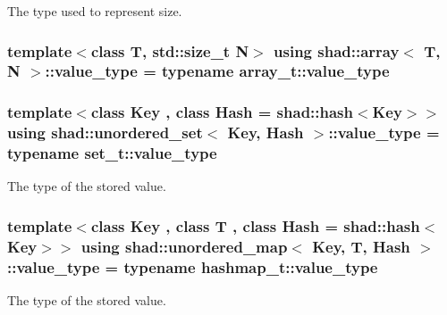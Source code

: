 The type used to represent size. 

\hypertarget{group__Types_gaf417752888d4f1e19286503579310a52}{
\subsubsection[{value\-\_\-type}]{\setlength{\rightskip}{0pt plus 5cm}template$<$class T, std\-::size\-\_\-t N$>$ using {\bf shad\-::array}$<$ T, N $>$\-::value\-\_\-type =  typename array\-\_\-t\-::value\-\_\-type}}\label{group__Types_gaf417752888d4f1e19286503579310a52}
\hypertarget{group__Types_ga56832ea0d8218bf22f59a2e8ff4de499}{
\subsubsection[{value\-\_\-type}]{\setlength{\rightskip}{0pt plus 5cm}template$<$class Key , class Hash  = shad\-::hash$<$\-Key$>$$>$ using {\bf shad\-::unordered\-\_\-set}$<$ Key, Hash $>$\-::value\-\_\-type =  typename set\-\_\-t\-::value\-\_\-type}}\label{group__Types_ga56832ea0d8218bf22f59a2e8ff4de499}


The type of the stored value. 

\hypertarget{group__Types_ga930e4848d41a2efe4d2e47f52650a76c}{
\subsubsection[{value\-\_\-type}]{\setlength{\rightskip}{0pt plus 5cm}template$<$class Key , class T , class Hash  = shad\-::hash$<$\-Key$>$$>$ using {\bf shad\-::unordered\-\_\-map}$<$ Key, T, Hash $>$\-::value\-\_\-type =  typename hashmap\-\_\-t\-::value\-\_\-type}}\label{group__Types_ga930e4848d41a2efe4d2e47f52650a76c}


The type of the stored value. 

